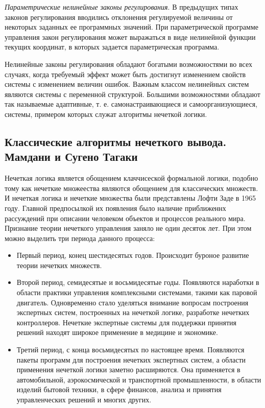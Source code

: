 \textit{Параметрические нелинейные законы регулирования}. В предыдущих типах законов регулирования вводились отклонения регулируемой величины от некоторых заданных ее программных значений. При параметрической программе управления закон регулирования может выражаться в виде нелинейной функции текущих координат, в которых задается параметрическая программа.

Нелинейные законы регулирования обладают богатыми возможностями во всех случаях, когда требуемый эффект может быть достигнут изменением свойств системы с изменением величин ошибок. Важным классом нелинейных систем являются системы с переменной структурой. Большими возможностями обладают так называемые адаптивные, т. е. самонастраивающиеся и самоорганизующиеся, системы, примером которых служат алгоритмы нечеткой логики.

\subsection{Классические алгоритмы нечеткого вывода.  Мамдани и Сугено Тагаки}
\label{sub:domain:3}

Нечеткая логика является обощением клаччисеской формальной логики, подобно тому как нечеткие множеества являются обощением для классических множеств.
И нечеткая логика и нечеткие множества были представлены Лофти Заде в 1965 году. Главной предпосылкой их появления было наличие приближеннх рассуждений при описании
человеком объектов и процессов реального мира. Признание теории нечеткого управления заняло не один десяток лет.
При этом можно выделить три периода данного процесса:
\begin{itemize}
  \item Первый период, конец шестидесятых годов. Происходит буроное развитие теории нечетких множеств.
  \item Второй период, семидесятые и восьмидесятые годы. Появляются наработки в области практики управления комплексными системами, такими как паровой двигатель.
  Одновременно стало уделяться внимание вопросам построения экспертных систем, построенных на нечеткой логике,
   разработке нечетких контроллеров. Нечеткие экспертные системы для поддержки принятия решений находят широкое применение в медицине и экономике.
  \item Третий период, с  конца восьмидесятых по настоящее время. Появляются пакеты программ для построения нечетких экспертных систем,
а области применения нечеткой логики заметно расширяются. Она применяется в автомобильной, аэрокосмической и транспортной промышленности,
в области изделий бытовой техники, в сфере финансов, анализа и принятия управленческих решений и многих других.
\end{itemize}


